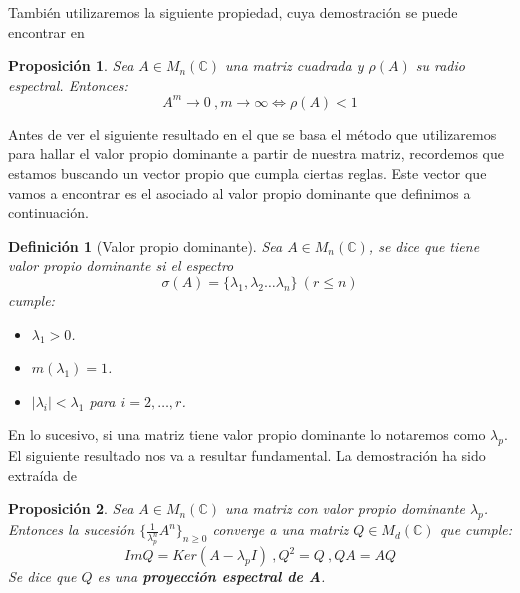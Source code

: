 \documentclass[size=a4, parskip=half, titlepage=false, toc=flat, toc=bib, 12pt]{scrartcl}
\theoremstyle{theorem-style}
\newtheorem{nprop}{Proposición}[section]
\theoremstyle{definition-style}
\newtheorem{ndef}{Definición}[section]
\theoremstyle{remark-style}
\theoremstyle{example-style}
\theoremstyle{definition-style}
\theoremstyle{remark-style}
\begin{document}
También utilizaremos la siguiente propiedad, cuya demostración se puede encontrar en \cite{modelos}

\begin{nprop}
\label{res1}
Sea $A \in M_n(\mathbb{C})$ una matriz cuadrada y $\rho(A)$ su radio espectral. Entonces:
$$A^m \rightarrow 0 \ ,  m \rightarrow \infty \Leftrightarrow \rho(A) < 1 $$
\end{nprop}

Antes de ver el siguiente resultado en el que se basa el método que utilizaremos para hallar el valor propio dominante a partir de nuestra matriz, recordemos que estamos buscando un vector propio que cumpla ciertas reglas. Este vector que vamos a encontrar es el asociado al valor propio dominante que definimos a continuación.

\begin{ndef}[Valor propio dominante]
Sea $A \in M_n(\mathbb{C})$, se dice que tiene valor propio dominante si el espectro
$$\sigma (A) = \{ \lambda_1, \lambda_2 \dots \lambda_n \} \   (r \leq n)$$
cumple:
\begin{itemize}
\item $\lambda_1 > 0$.
\item $m(\lambda_1) = 1$.
\item $|\lambda_i| < \lambda_1$ para $i = 2, \dots , r$.
\end{itemize}
\end{ndef}
En lo sucesivo, si una matriz tiene valor propio dominante lo notaremos como $\lambda_p$. El siguiente resultado nos va a resultar fundamental. La demostración ha sido extraída de \cite{modelos}

\begin{nprop} Sea $A \in M_n(\mathbb{C})$ una matriz con valor propio dominante $\lambda_p$. Entonces la sucesión $\{\frac{1}{ \lambda_p^n } A^n \}_{n\geq 0}$ converge a una matriz $Q \in M_d(\mathbb{C})$ que cumple:
$$ImQ = Ker ( A - \lambda_p I) \ , Q^2 = Q \ , QA = AQ $$
Se dice que $Q$ es una \textbf{proyección espectral de A}.
\label{converge}
\end{nprop}
\end{document}
